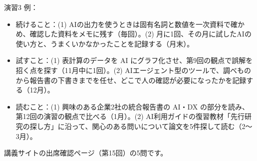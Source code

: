 \begin{answer}{演習3}
例：
\begin{itemize}
  \item 続けること：(1) AIの出力を使うときは固有名詞と数値を一次資料で確かめ、確認した資料をメモに残す（毎回）。(2) 月に1回、その月に試したAIの使い方と、うまくいかなかったことを記録する（月末）。
  \item 試すこと：(1) 表計算のデータを AI にグラフ化させ、第9回の観点で誤解を招く点を探す（11月中に1回）。(2) AIエージェント型のツールで、調べものから報告書の下書きまでを任せ、どこで人の確認が必要になったかを記録する（12月）。
  \item 読むこと：(1) 興味のある企業2社の統合報告書の AI・DX の部分を読み、第12回の演習の観点で比べる（1月）。(2) AI利用ガイドの復習教材「先行研究の探し方」に沿って、関心のある問いについて論文を5件探して読む（2〜3月）。
\end{itemize}
\end{answer}

講義サイトの出席確認ページ（第15回）の5問です。


